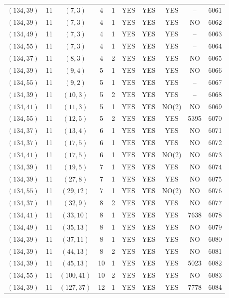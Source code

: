 \begin{longtable}{|c|c|c|c|c|c|c|c|c|c|}
$(134, 39)$ & 11 & $(7, 3)$ & 4 & 1 & YES & YES & YES & -- & 6061\\
$(134, 39)$ & 11 & $(7, 3)$ & 4 & 1 & YES & YES & YES & NO & 6062\\
$(134, 49)$ & 11 & $(7, 3)$ & 4 & 1 & YES & YES & YES & -- & 6063\\
$(134, 55)$ & 11 & $(7, 3)$ & 4 & 1 & YES & YES & YES & -- & 6064\\
$(134, 37)$ & 11 & $(8, 3)$ & 4 & 2 & YES & YES & YES & NO & 6065\\
$(134, 39)$ & 11 & $(9, 4)$ & 5 & 1 & YES & YES & YES & NO & 6066\\
$(134, 55)$ & 11 & $(9, 2)$ & 5 & 1 & YES & YES & YES & -- & 6067\\
$(134, 39)$ & 11 & $(10, 3)$ & 5 & 2 & YES & YES & YES & -- & 6068\\
$(134, 41)$ & 11 & $(11, 3)$ & 5 & 1 & YES & YES & NO(2) & NO & 6069\\
$(134, 55)$ & 11 & $(12, 5)$ & 5 & 2 & YES & YES & YES & 5395 & 6070\\
$(134, 37)$ & 11 & $(13, 4)$ & 6 & 1 & YES & YES & YES & NO & 6071\\
$(134, 37)$ & 11 & $(17, 5)$ & 6 & 1 & YES & YES & YES & NO & 6072\\
$(134, 41)$ & 11 & $(17, 5)$ & 6 & 1 & YES & YES & NO(2) & NO & 6073\\
$(134, 39)$ & 11 & $(19, 5)$ & 7 & 1 & YES & YES & YES & NO & 6074\\
$(134, 39)$ & 11 & $(27, 8)$ & 7 & 1 & YES & YES & YES & NO & 6075\\
$(134, 55)$ & 11 & $(29, 12)$ & 7 & 1 & YES & YES & NO(2) & NO & 6076\\
$(134, 37)$ & 11 & $(32, 9)$ & 8 & 2 & YES & YES & YES & NO & 6077\\
$(134, 41)$ & 11 & $(33, 10)$ & 8 & 1 & YES & YES & YES & 7638 & 6078\\
$(134, 49)$ & 11 & $(35, 13)$ & 8 & 1 & YES & YES & YES & NO & 6079\\
$(134, 39)$ & 11 & $(37, 11)$ & 8 & 1 & YES & YES & YES & NO & 6080\\
$(134, 39)$ & 11 & $(44, 13)$ & 8 & 2 & YES & YES & YES & NO & 6081\\
$(134, 39)$ & 11 & $(45, 13)$ & 10 & 1 & YES & YES & YES & 5023 & 6082\\
$(134, 55)$ & 11 & $(100, 41)$ & 10 & 2 & YES & YES & YES & NO & 6083\\
$(134, 39)$ & 11 & $(127, 37)$ & 12 & 1 & YES & YES & YES & 7778 & 6084\\

\end{longtable}
